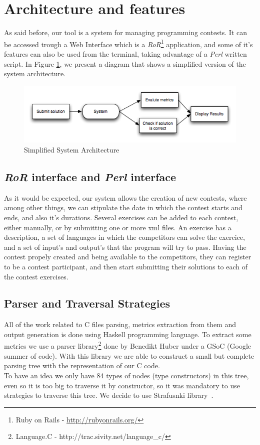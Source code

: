 \section{Architecture and features}
As said before, our tool is a system for managing programming contests. It can be accessed trough a Web Interface which is a \textit{RoR}\footnote{Ruby on Rails - \url{http://rubyonrails.org/}} application, and some of it's features can also be used from the terminal, taking advantage of a \textit{Perl} written script.
In Figure \ref{fig:arq}, we present a diagram that shows a simplified version of the system architecture.

\begin{figure}[htbp]
\includegraphics[scale=0.7]{images/arq}
\caption{Simplified System Architecture}
\label{fig:arq}
\end{figure}

\subsection{\textit{RoR} interface and \textit{Perl} interface}
As it would be expected, our system allows the creation of new contests, where among other things,
we can stipulate the date in which the contest starts and ends, and also it's durations.
Several exercises can be added to each contest, either manually, or by submitting one or more xml files.
An exercise has a description, a set of languages in which the competitors can solve the exercice, and a set of
input's and output's that the program will try to pass.
Having the contest propely created and being available to the competitors, they can register to be a contest participant,
and then start submitting their solutions to each of the contest exercises.  

\subsection{Parser and Traversal Strategies}
All of the work related to C files parsing, metrics extraction from them and output generation is done
using Haskell programming language. To extract some metrics we use a parser
library\footnote{Language.C - http://trac.sivity.net/language\_c/} done by Benedikt Huber under a GSoC (Google summer of code).
With this library we are able to construct a small but complete parsing tree with the representation of our C code.\\
\indent To have an idea we only have 84 types of nodes (type constructors) in this tree, even so it is too big to traverse it by constructor, so
it was mandatory to use strategies to traverse this tree. We decide to use Strafusnki library~\cite{LV03-PADL}.

